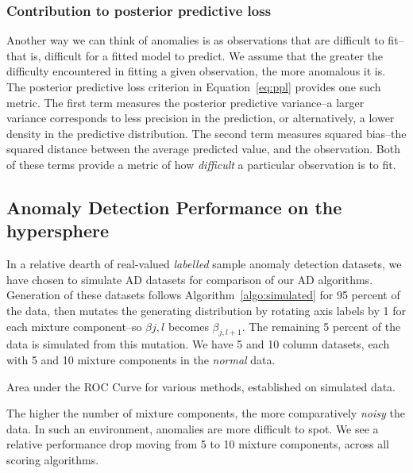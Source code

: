 \subsubsection{Contribution to posterior predictive loss}
Another way we can think of anomalies is as observations that are difficult to fit--that is, difficult
  for a fitted model to predict.  We assume that the greater the difficulty encountered in fitting a
  given observation, the more anomalous it is.  The posterior predictive loss criterion in
  Equation~\ref{eq:ppl} provides one such metric.  The first term measures the posterior predictive
  variance--a larger variance corresponds to less precision in the prediction, or alternatively, a lower
  density in the predictive distribution.  The second term measures squared bias--the squared distance
  between the average predicted value, and the observation.  Both of these terms provide a metric of
  how \emph{difficult} a particular observation is to fit.

\subsection{Anomaly Detection Performance on the hypersphere}
In a relative dearth of real-valued \emph{labelled} sample anomaly detection datasets, we have chosen
  to simulate AD datasets for comparison of our AD algorithms.  Generation of these datasets
  follows Algorithm~\ref{algo:simulated} for 95 percent of the data, then mutates the generating
  distribution by rotating axis labels by 1 for each mixture component--so $\beta{j,l}$ becomes
  $\beta_{j,l+1}$.  The remaining 5 percent of the data is simulated from this mutation.
  We have 5 and 10 column datasets, each with 5 and 10 mixture components in the \emph{normal} data.

\begin{table}[h]
  \centering
  \label{tab:ad_sim_results}
  
  \caption{Area under the ROC Curve for various methods, established on simulated data.  }
\end{table}

The higher the number of mixture components, the more comparatively \emph{noisy} the data.  In such
  an environment, anomalies are more difficult to spot.  We see a relative performance drop moving
  from 5 to 10 mixture components, across all scoring algorithms.





